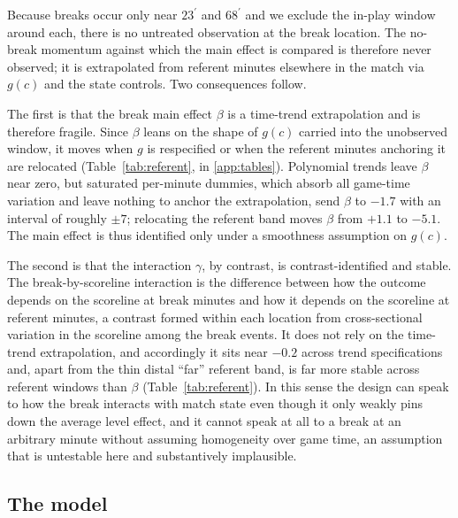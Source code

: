 \documentclass[11pt]{article}
\begin{document}
Because breaks occur only near $23^\prime$ and $68^\prime$ and we exclude the in-play window around each,
there is no untreated observation at the break location. The no-break momentum against which the main effect
is compared is therefore never observed; it is extrapolated from referent minutes elsewhere in the match via
$g(c)$ and the state controls. Two consequences follow.

The first is that the break main effect $\beta$ is a time-trend extrapolation and is therefore fragile. Since
$\beta$ leans on the shape of $g(c)$ carried into the unobserved window, it moves when $g$ is respecified or
when the referent minutes anchoring it are relocated (Table~\ref{tab:referent}, in \ref{app:tables}).
Polynomial trends leave
$\beta$ near zero, but saturated per-minute dummies, which absorb all game-time variation and leave nothing to
anchor the extrapolation, send $\beta$ to $-1.7$ with an interval of roughly $\pm 7$; relocating the referent
band moves $\beta$ from $+1.1$ to $-5.1$. The main effect is thus identified only under a smoothness
assumption on $g(c)$.

The second is that the interaction $\gamma$, by contrast, is contrast-identified and stable. The
break-by-scoreline interaction is the difference between how the outcome depends on the scoreline at break
minutes and how it depends on the scoreline at referent minutes, a contrast formed within each location from
cross-sectional variation in the scoreline among the break events. It does not rely on the time-trend
extrapolation, and accordingly it sits near $-0.2$ across trend specifications and, apart from the thin distal
``far'' referent band, is far more stable across referent windows than $\beta$ (Table~\ref{tab:referent}). In this sense the design can speak to how the break interacts with
match state even though it only weakly pins down the average level effect, and it cannot speak at all to a
break at an arbitrary minute without assuming homogeneity over game time, an assumption that is untestable
here and substantively implausible.



\subsection{The model}
\label{sec:model}
\end{document}
